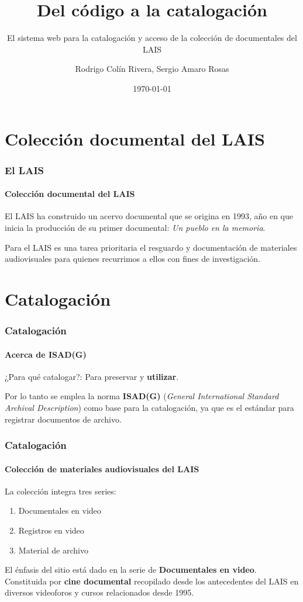 \documentclass{beamer}
\title{Del código a la catalogación}
\subtitle{El sistema web para la catalogación y acceso de la colección de documentales del LAIS}
\author{Rodrigo Colín Rivera, Sergio Amaro Rosas}
\institute
{
  Laboratorio Audiovisual de Investigación Social\\
  Instituto de Investigaciones Dr. José María Luis Mora
}
\date{\today}
\begin{document}
\frame{\titlepage} %

\section{Colección documental del LAIS}
\begin{frame}
	\frametitle{El LAIS}
	\framesubtitle{Colección documental del LAIS}
	
	El LAIS ha construido un acervo documental que se origina en 1993, año en que inicia la producción de su primer documental: \textit{Un pueblo en la memoria}.

	Para el LAIS es una tarea prioritaria el resguardo y documentación de materiales audiovisuales para quienes recurrimos a ellos con fines de investigación.
	
\end{frame}

\section{Catalogación}
\begin{frame}
	\frametitle{Catalogación}
	\framesubtitle{Acerca de ISAD(G)}
	
	¿Para qué catalogar?: Para preservar y \textbf{utilizar}.
	
	Por lo tanto se emplea la norma \textbf{ISAD(G)} (\textit{General International Standard Archival Description}) como base para la catalogación, ya que es el estándar para registrar documentos de archivo.
\end{frame}

\begin{frame}
	\frametitle{Catalogación}
	\framesubtitle{Colección de materiales audiovisuales del LAIS}
	
	La colección integra tres series:
	\begin{enumerate}
		\item Documentales en video
		\item Registros en video
		\item Material de archivo
	\end{enumerate}
	
	El énfasis del sitio está dado en la serie de \textbf{Documentales en video}. Constituida por \textbf{cine documental} recopilado desde los antecedentes del LAIS en diversos videoforos y cursos relacionados desde 1995.
	
\end{frame}
\end{document}
